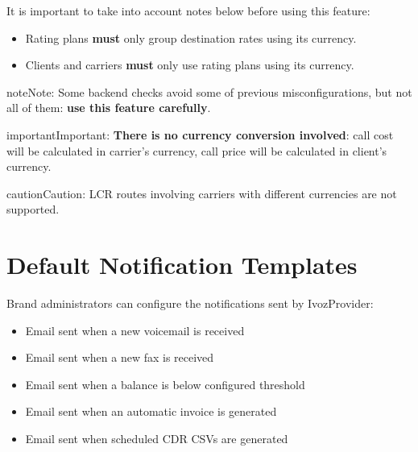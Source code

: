 \documentclass[letterpaper,10pt,english]{sphinxmanual}
\begin{document}
It is important to take into account notes below before using this feature:
\begin{itemize}
\item {} 
Rating plans \textbf{must} only group destination rates using its currency.

\item {} 
Clients and carriers \textbf{must} only use rating plans using its currency.

\end{itemize}

\begin{notice}{note}{Note:}
Some backend checks avoid some of previous misconfigurations, but not all of them: \textbf{use this feature carefully}.
\end{notice}

\begin{notice}{important}{Important:}
\textbf{There is no currency conversion involved}: call cost will be calculated in carrier's currency, call price
will be calculated in client's currency.
\end{notice}

\begin{notice}{caution}{Caution:}
LCR routes involving carriers with different currencies are not supported.
\end{notice}


\section{Default Notification Templates}
\label{administration_portal/platform/default_notification_templates::doc}\label{administration_portal/platform/default_notification_templates:default-notification-templates}\label{administration_portal/platform/default_notification_templates:id1}
Brand administrators can configure the notifications sent by IvozProvider:
\begin{itemize}
\item {} 
Email sent when a new voicemail is received

\item {} 
Email sent when a new fax is received

\item {} 
Email sent when a balance is below configured threshold

\item {} 
Email sent when an automatic invoice is generated

\item {} 
Email sent when scheduled CDR CSVs are generated

\end{itemize}
\end{document}
